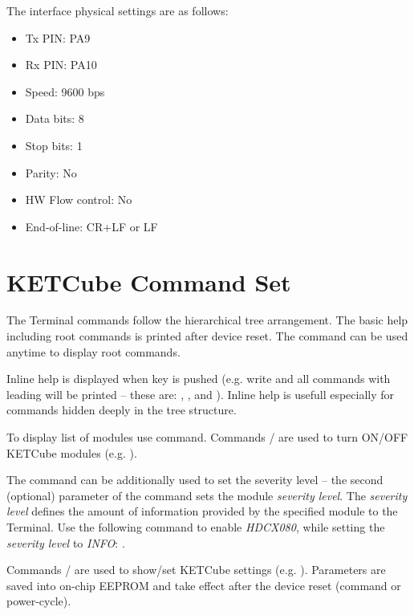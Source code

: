 The interface physical settings are as follows:

\begin{itemize}
  \item Tx PIN: PA9
  \item Rx PIN: PA10
  \item Speed: 9600 bps
  \item Data bits: 8
  \item Stop bits: 1
  \item Parity: No
  \item HW Flow control: No
  \item End-of-line: CR+LF or LF
\end{itemize}

\clearpage
\section{KETCube Command Set}
The Terminal commands follow the hierarchical tree arrangement. The basic help including root commands is printed after device reset. The command  can be used anytime to display root commands.

Inline help is displayed when \docKCCmdInline{[TAB]} key is pushed (e.g. write  and all commands with leading  will be printed -- these are: , ,  and ). Inline help is usefull especially for commands hidden deeply in the tree structure.

To display list of modules use  command. Commands / are used to turn ON/OFF KETCube modules (e.g. ). 

The  command can be additionally used to set the severity level -- the second (optional) parameter of the command sets the module {\it severity level}. The {\it severity level} defines the amount of information provided by the specified module to the Terminal. Use the following command to enable {\it HDCX080}, while setting the {\it severity level} to {\it INFO}: .

Commands / are used to show/set KETCube settings (e.g. ). Parameters are saved into on-chip EEPROM and take effect after the device reset (command  or power-cycle).


